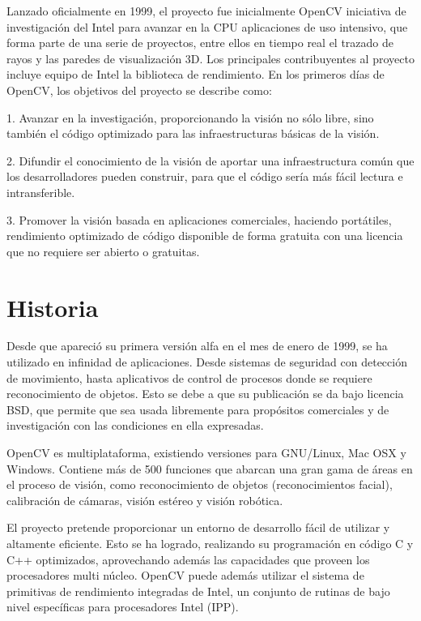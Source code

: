 Lanzado oficialmente en 1999, el proyecto fue inicialmente OpenCV iniciativa de investigación del Intel para avanzar en la CPU aplicaciones de uso intensivo, que forma parte de una serie de proyectos, entre ellos en tiempo real el trazado de rayos y las paredes de visualización 3D. Los principales contribuyentes al proyecto incluye equipo de Intel la biblioteca de rendimiento. En los primeros días de OpenCV, los objetivos del proyecto se describe como:

1. Avanzar en la investigación, proporcionando la visión no sólo libre, sino también el código optimizado para las infraestructuras básicas de la visión.

2. Difundir el conocimiento de la visión de aportar una infraestructura común que los desarrolladores pueden construir, para que el código sería más fácil lectura e intransferible.

3. Promover la visión basada en aplicaciones comerciales, haciendo portátiles, rendimiento optimizado de código disponible de forma gratuita con una licencia que no requiere ser abierto o gratuitas.

\section{Historia}

Desde que apareció su primera versión alfa en el mes de enero de 1999, se ha utilizado en infinidad de aplicaciones. Desde sistemas de seguridad con detección de movimiento, hasta aplicativos de control de procesos donde se requiere reconocimiento de objetos. Esto se debe a que su publicación se da bajo licencia BSD, que permite que sea usada libremente para propósitos comerciales y de investigación con las condiciones en ella expresadas.

OpenCV es multiplataforma, existiendo versiones para GNU/Linux, Mac OSX y Windows. Contiene más de 500 funciones que abarcan una gran gama de áreas en el proceso de visión, como reconocimiento de objetos (reconocimientos facial), calibración de cámaras, visión estéreo y visión robótica.

El proyecto pretende proporcionar un entorno de desarrollo fácil de utilizar y altamente eficiente. Esto se ha logrado, realizando su programación en código C y C++ optimizados, aprovechando además las capacidades que proveen los procesadores multi núcleo. OpenCV puede además utilizar el sistema de primitivas de rendimiento integradas de Intel, un conjunto de rutinas de bajo nivel específicas para procesadores Intel (IPP).

